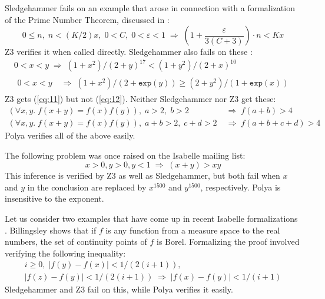 \documentclass[runningheds]{llncs}
\newcommand{\myRightarrow}{\; \Rightarrow \;}
\newcommand{\fn}[1]{\mathtt{#1}} \newcommand{\nroot}{\fn{root}}
\begin{document}
Sledgehammer fails on an example that arose in connection with a formalization of the Prime Number Theorem, discussed in \cite{avigad:et:al:07}:
\begin{equation}
\label{eq:10}
0 \leq n, \; n < (K / 2)x, \; 0 < C, \; 0 < \varepsilon < 1 \myRightarrow \left(1 + \frac{\varepsilon}{3 (C + 3)}\right) \cdot n < K x
\end{equation}
Z3 verifies it when called directly. Sledgehammer also fails on these \cite{avigad:friedman:06}:
\begin{gather}
\label{eq:11}
0 < x < y \myRightarrow (1+x^2)/(2+y)^{17} < (1+y^2)/(2+x)^{10} \\
\label{eq:12}
\begin{split}
0 < x < y & \myRightarrow (1+x^2)/(2+\fn{exp}(y))\geq  (2+y^2)/(1+\fn{exp}(x))
\end{split}
\end{gather}
Z3 gets (\ref{eq:11}) but not (\ref{eq:12}). Neither Sledgehammer nor Z3 get these:
\begin{align}
\label{eq:13}
(\forall x, y. \; f(x + y) = f(x) f(y)), \; a > 2, \; b > 2 & \myRightarrow f(a + b) > 4 \\
\label{eq:14}
(\forall x, y. \; f(x + y) = f(x) f(y)), \; a + b > 2, \; c + d > 2 & \myRightarrow f(a + b + c + d) > 4
\end{align}
Polya verifies all of the above easily.

The following problem was once raised on the Isabelle mailing list:
\begin{equation}
   x>0, y>0, y<1 \myRightarrow (x+y) > xy
\end{equation}
This inference is verified by Z3 as well as Sledgehammer, but both fail when $x$ and $y$ in the conclusion are replaced by $x^{1500}$ and $y^{1500}$, respectively. Polya is insensitive to the exponent.

Let us consider two examples that have come up in recent Isabelle formalizations \cite{avigad:holzl:serafin:unp}. Billingsley  \cite[page 334]{billingsley:95} shows that if $f$ is any function from a measure space to the real numbers, the set of continuity points of $f$ is Borel. Formalizing the proof involved verifying the following inequality:
\begin{multline}
 i \geq 0, \; |f(y) - f(x)| < 1 / (2 (i + 1)), \\ 
 |f(z) - f(y)| < 1 / (2 (i + 1)) \myRightarrow |f(x) - f(y)| < 1 / (i + 1)
\end{multline}
Sledgehammer and Z3 fail on this, while Polya verifies it easily. 
\end{document}
